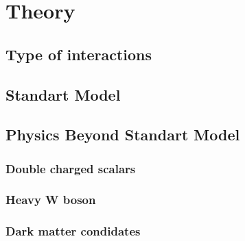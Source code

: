 \chapter{Theory}
\label{chap:Theory}



\section{Type of interactions}
\label{sec:typeOfInteractions}

\section{Standart Model}
\label{sec:standartModel}

\section{Physics Beyond Standart Model}
\label{sec:beyondStandartModel}

\subsection{Double charged scalars}
\subsection{Heavy W boson}
\subsection{Dark matter condidates}

